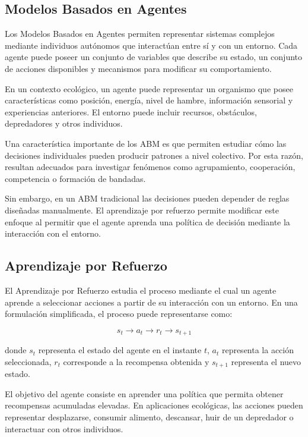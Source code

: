 \documentclass[conference]{IEEEtran}
\begin{document}
\subsection{Modelos Basados en Agentes}

Los Modelos Basados en Agentes permiten representar sistemas complejos
mediante individuos autónomos que interactúan entre sí y con un entorno.
Cada agente puede poseer un conjunto de variables que describe su estado,
un conjunto de acciones disponibles y mecanismos para modificar su
comportamiento.

En un contexto ecológico, un agente puede representar un organismo que
posee características como posición, energía, nivel de hambre,
información sensorial y experiencias anteriores. El entorno puede incluir
recursos, obstáculos, depredadores y otros individuos.

Una característica importante de los ABM es que permiten estudiar cómo
las decisiones individuales pueden producir patrones a nivel colectivo.
Por esta razón, resultan adecuados para investigar fenómenos como
agrupamiento, cooperación, competencia o formación de bandadas.

Sin embargo, en un ABM tradicional las decisiones pueden depender de
reglas diseñadas manualmente. El aprendizaje por refuerzo permite
modificar este enfoque al permitir que el agente aprenda una política de
decisión mediante la interacción con el entorno.

\subsection{Aprendizaje por Refuerzo}

El Aprendizaje por Refuerzo estudia el proceso mediante el cual un agente
aprende a seleccionar acciones a partir de su interacción con un entorno.
En una formulación simplificada, el proceso puede representarse como:

\begin{equation}
s_t \rightarrow a_t \rightarrow r_t \rightarrow s_{t+1}
\end{equation}

donde $s_t$ representa el estado del agente en el instante $t$, $a_t$
representa la acción seleccionada, $r_t$ corresponde a la recompensa
obtenida y $s_{t+1}$ representa el nuevo estado.

El objetivo del agente consiste en aprender una política que permita
obtener recompensas acumuladas elevadas. En aplicaciones ecológicas, las
acciones pueden representar desplazarse, consumir alimento, descansar,
huir de un depredador o interactuar con otros individuos.
\end{document}

